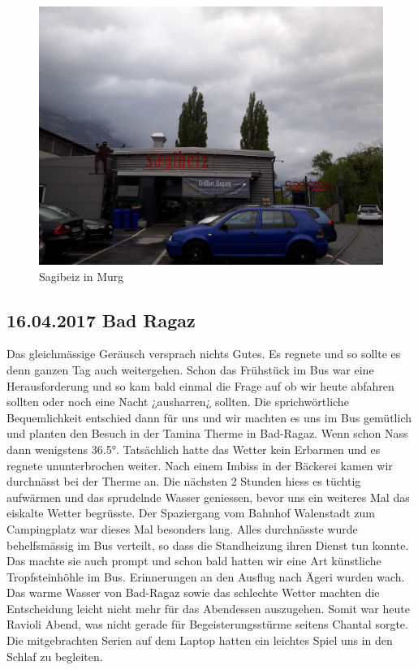 \begin{figure}[H]
    \centering
    \includegraphics[width=\textwidth]{../Bilder/Walensee/31.jpg}
    \caption{Sagibeiz in Murg}
    \label{img:Sagibeiz}
\end{figure}

\subsection{16.04.2017 Bad Ragaz} 
Das gleichmässige Geräusch versprach nichts Gutes.
Es regnete und so sollte es denn ganzen Tag auch weitergehen.
Schon das Frühstück im Bus war eine Herausforderung und so kam bald einmal die Frage auf ob wir heute abfahren sollten oder noch eine Nacht ¿ausharren¿ sollten.
Die sprichwörtliche Bequemlichkeit entschied dann für uns und wir machten es uns im Bus gemütlich und planten den Besuch in der Tamina Therme in Bad-Ragaz.
Wenn schon Nass dann wenigstens 36.5°.
Tatsächlich hatte das Wetter kein Erbarmen und es regnete ununterbrochen weiter.
Nach einem Imbiss in der Bäckerei kamen wir durchnässt bei der Therme an.
Die nächsten 2 Stunden hiess es tüchtig aufwärmen und das sprudelnde Wasser geniessen, bevor uns ein weiteres Mal das eiskalte Wetter begrüsste.
Der Spaziergang vom Bahnhof Walenstadt zum Campingplatz war dieses Mal besonders lang. 
Alles durchnässte wurde behelfsmässig im Bus verteilt, so dass die Standheizung ihren Dienst tun konnte.
Das machte sie auch prompt und schon bald hatten wir eine Art künstliche Tropfsteinhöhle im Bus.
Erinnerungen an den Ausflug nach Ägeri wurden wach.
Das warme Wasser von Bad-Ragaz sowie das schlechte Wetter machten die Entscheidung leicht nicht mehr für das Abendessen auszugehen.
Somit war heute Ravioli Abend, was nicht gerade für Begeisterungsstürme seitens Chantal sorgte.
Die mitgebrachten Serien auf dem Laptop hatten ein leichtes Spiel uns in den Schlaf zu begleiten.

